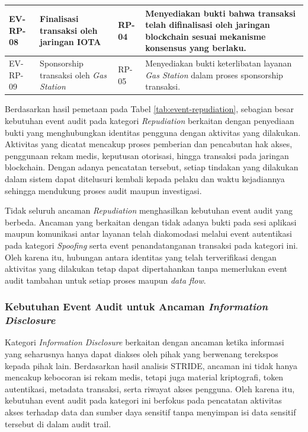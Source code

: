 \begin{xltabular}{\textwidth}{|>{\centering\arraybackslash}p{1.4cm}|X|>{\centering\arraybackslash}p{1.9cm}|X|}
EV-RP-08 &
Finalisasi transaksi oleh jaringan IOTA &
RP-04 &
Menyediakan bukti bahwa transaksi telah difinalisasi oleh jaringan blockchain sesuai mekanisme konsensus yang berlaku.\\
\hline

EV-RP-09 &
Sponsorship transaksi oleh \textit{Gas Station} &
RP-05 &
Menyediakan bukti keterlibatan layanan \textit{Gas Station} dalam proses sponsorship transaksi.\\
\hline

\end{xltabular}


Berdasarkan hasil pemetaan pada Tabel \ref{tab:event-repudiation}, sebagian besar kebutuhan event audit pada kategori \textit{Repudiation} berkaitan dengan penyediaan bukti yang menghubungkan identitas pengguna dengan aktivitas yang dilakukan. Aktivitas yang dicatat mencakup proses pemberian dan pencabutan hak akses, penggunaan rekam medis, keputusan otorisasi, hingga transaksi pada jaringan blockchain. Dengan adanya pencatatan tersebut, setiap tindakan yang dilakukan dalam sistem dapat ditelusuri kembali kepada pelaku dan waktu kejadiannya sehingga mendukung proses audit maupun investigasi.

Tidak seluruh ancaman \textit{Repudiation} menghasilkan kebutuhan event audit yang berbeda. Ancaman yang berkaitan dengan tidak adanya bukti pada sesi aplikasi maupun komunikasi antar layanan telah diakomodasi melalui event autentikasi pada kategori \textit{Spoofing} serta event penandatanganan transaksi pada kategori ini. Oleh karena itu, hubungan antara identitas yang telah terverifikasi dengan aktivitas yang dilakukan tetap dapat dipertahankan tanpa memerlukan event audit tambahan untuk setiap proses maupun \textit{data flow}.

\subsubsection{Kebutuhan Event Audit untuk Ancaman \textit{Information Disclosure}}

Kategori \textit{Information Disclosure} berkaitan dengan ancaman ketika informasi yang seharusnya hanya dapat diakses oleh pihak yang berwenang terekspos kepada pihak lain. Berdasarkan hasil analisis STRIDE, ancaman ini tidak hanya mencakup kebocoran isi rekam medis, tetapi juga material kriptografi, token autentikasi, metadata transaksi, serta riwayat akses pengguna. Oleh karena itu, kebutuhan event audit pada kategori ini berfokus pada pencatatan aktivitas akses terhadap data dan sumber daya sensitif tanpa menyimpan isi data sensitif tersebut di dalam audit trail.

